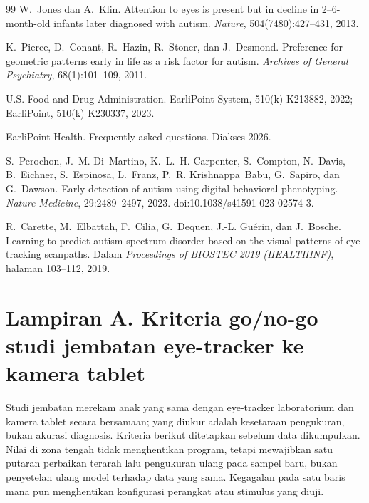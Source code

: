 \documentclass[10pt,letterpaper]{article}
\begin{document}
\begin{thebibliography}{99}
W.~Jones dan A.~Klin. Attention to eyes is present but in decline in 2--6-month-old
infants later diagnosed with autism. \textit{Nature}, 504(7480):427--431, 2013.

K.~Pierce, D.~Conant, R.~Hazin, R.~Stoner, dan J.~Desmond. Preference for geometric
patterns early in life as a risk factor for autism. \textit{Archives of General
Psychiatry}, 68(1):101--109, 2011.

U.S. Food and Drug Administration. EarliPoint System, 510(k) K213882, 2022; EarliPoint,
510(k) K230337, 2023.

EarliPoint Health. Frequently asked questions. Diakses 2026.

S.~Perochon, J.~M. Di~Martino, K.~L.~H. Carpenter, S.~Compton, N.~Davis, B.~Eichner,
S.~Espinosa, L.~Franz, P.~R. Krishnappa~Babu, G.~Sapiro, dan G.~Dawson. Early detection
of autism using digital behavioral phenotyping. \textit{Nature Medicine},
29:2489--2497, 2023. doi:10.1038/s41591-023-02574-3.

R.~Carette, M.~Elbattah, F.~Cilia, G.~Dequen, J.-L. Gu\'erin, dan J.~Bosche. Learning to
predict autism spectrum disorder based on the visual patterns of eye-tracking scanpaths.
Dalam \textit{Proceedings of BIOSTEC 2019 (HEALTHINF)}, halaman 103--112, 2019.

\end{thebibliography}

\newpage
\normalsize
\section*{Lampiran A. Kriteria go/no-go studi jembatan eye-tracker ke kamera tablet}

Studi jembatan merekam anak yang sama dengan eye-tracker laboratorium dan kamera tablet
secara bersamaan; yang diukur adalah kesetaraan pengukuran, bukan akurasi diagnosis. Kriteria
berikut ditetapkan sebelum data dikumpulkan. Nilai di zona tengah tidak menghentikan program,
tetapi mewajibkan satu putaran perbaikan terarah lalu pengukuran ulang pada sampel baru,
bukan penyetelan ulang model terhadap data yang sama. Kegagalan pada satu baris mana pun
menghentikan konfigurasi perangkat atau stimulus yang diuji.
\end{document}
